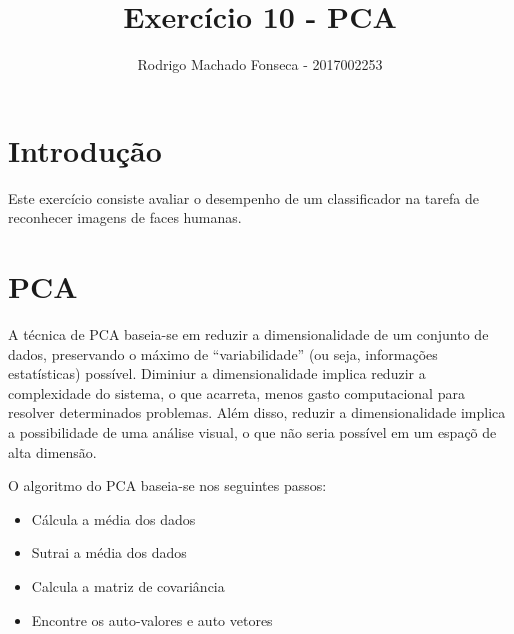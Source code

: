 \documentclass[12pt]{article}
\begin{document}

\pagestyle{fancy}
\fancyhf{}
\renewcommand{\headrulewidth}{0.4pt}
\fancyfoot[C]{\thepage}
\renewcommand{\footrulewidth}{0.4pt}
\fancyfoot[C]{\thepage}
\title{\LARGE \bf
 Exercício 10 - PCA }
\author{ Rodrigo Machado Fonseca - 2017002253}
\thispagestyle{fancy}
\maketitle
\thispagestyle{fancy}

\section{Introdução}

  \par Este exercício consiste avaliar o desempenho de um classificador na tarefa de reconhecer imagens de faces humanas.
  
\section{PCA}
  
  \par A técnica de PCA baseia-se em  reduzir a dimensionalidade de um conjunto de dados, preservando o máximo de “variabilidade” (ou seja, informações estatísticas) possível. Diminiur a dimensionalidade implica reduzir a complexidade do sistema, o que acarreta, menos gasto computacional para resolver determinados problemas. Além disso, reduzir a dimensionalidade implica a possibilidade de uma análise visual, o que não seria possível em um espaçõ de alta dimensão. 
  
  \par O algoritmo do PCA baseia-se nos seguintes passos:
  
  \begin{itemize}
    \item Cálcula a média dos dados
    \item Sutrai a média dos dados 
    \item Calcula a matriz de covariância
    \item Encontre os auto-valores e auto vetores
    
  \end{itemize}
  
\end{document}
